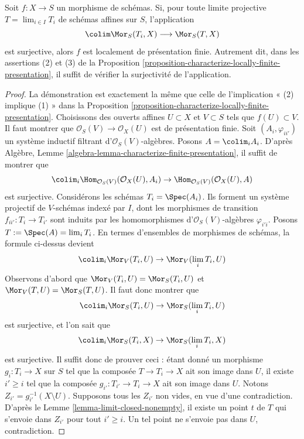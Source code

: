 \begin{lemma}
\label{lemma-surjection-is-enough}
Soit $f : X \to S$ un morphisme de schémas. Si, pour toute limite projective
$T = \lim_{i \in I} T_i$ de schémas affines sur $S$, l'application
$$
\colim \Mor_S(T_i, X) \longrightarrow \Mor_S(T, X)
$$
est surjective, alors $f$ est localement de présentation finie. Autrement
dit, dans les assertions (2) et (3) de la
Proposition \ref{proposition-characterize-locally-finite-presentation}, il
suffit de vérifier la surjectivité de l'application.
\end{lemma}

\begin{proof}
La démonstration est exactement la même que celle de l'implication
« (2) implique (1) » dans la
Proposition \ref{proposition-characterize-locally-finite-presentation}.
Choisissons des ouverts affines $U \subset X$ et $V \subset S$ tels que
$f(U) \subset V$. Il faut montrer que
$\mathcal{O}_S(V) \to \mathcal{O}_X(U)$ est de présentation finie. Soit
$(A_i, \varphi_{ii'})$ un système inductif filtrant d'$\mathcal{O}_S(V)$-algèbres.
Posons $A = \colim_i A_i$. D'après Algèbre,
Lemme \ref{algebra-lemma-characterize-finite-presentation}, il suffit de
montrer que
$$
\colim_i \Hom_{\mathcal{O}_S(V)}(\mathcal{O}_X(U), A_i) \to
\Hom_{\mathcal{O}_S(V)}(\mathcal{O}_X(U), A)
$$
est surjective. Considérons les schémas $T_i = \Spec(A_i)$. Ils forment un
système projectif de $V$-schémas indexé par $I$, dont les morphismes de
transition $f_{ii'} : T_i \to T_{i'}$ sont induits par les homomorphismes
d'$\mathcal{O}_S(V)$-algèbres $\varphi_{i'i}$. Posons
$T := \Spec(A) = \lim_i T_i$. En termes d'ensembles de morphismes de
schémas, la formule ci-dessus devient
$$
\colim_i \Mor_V(T_i, U) \to \Mor_V(\lim_i T_i, U)
$$
Observons d'abord que
$\Mor_V(T_i, U) = \Mor_S(T_i, U)$
et
$\Mor_V(T, U) = \Mor_S(T, U)$.
Il faut donc montrer que
$$
\colim_i \Mor_S(T_i, U) \to
\Mor_S(\lim_i T_i, U)
$$
est surjective, et l'on sait que
$$
\colim_i \Mor_S(T_i, X) \to
\Mor_S(\lim_i T_i, X)
$$
est surjective. Il suffit donc de prouver ceci : étant donné un morphisme
$g_i : T_i \to X$ sur $S$ tel que la composée $T \to T_i \to X$ ait son
image dans $U$, il existe $i' \geq i$ tel que la composée
$g_{i'} : T_{i'} \to T_i \to X$ ait son image dans $U$. Notons
$Z_{i'} = g_{i'}^{-1}(X \setminus U)$. Supposons tous les $Z_{i'}$ non vides,
en vue d'une contradiction. D'après le
Lemme \ref{lemma-limit-closed-nonempty}, il existe un point $t$ de $T$ qui
s'envoie dans $Z_{i'}$ pour tout $i' \geq i$. Un tel point ne s'envoie pas
dans $U$, contradiction.
\end{proof}

